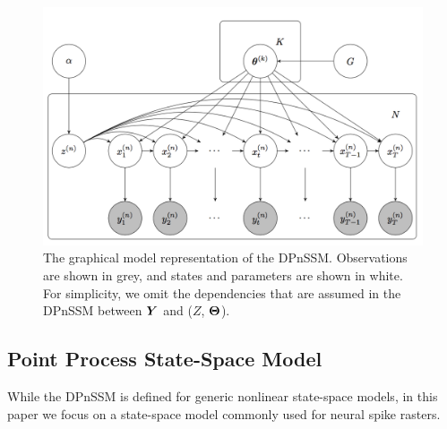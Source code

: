 \documentclass[twoside]{article}
\begin{document}
\begin{figure}[h]
\begin{center}
\includegraphics[scale=0.4]{img/graph.png}
\end{center}
\caption{{The graphical model representation of the DPnSSM. Observations are shown in grey, and states and parameters are shown in white. For simplicity, we omit the dependencies that are assumed in the DPnSSM between $\boldsymbol{Y}$ and ($Z$, $\boldsymbol{\Theta}$).}}
\label{model-graph}
\end{figure}

\subsection{Point Process State-Space Model}
\label{ppssm}
While the DPnSSM is defined for generic nonlinear state-space models, in this paper we focus on a state-space model commonly used for neural spike rasters.
\end{document}
